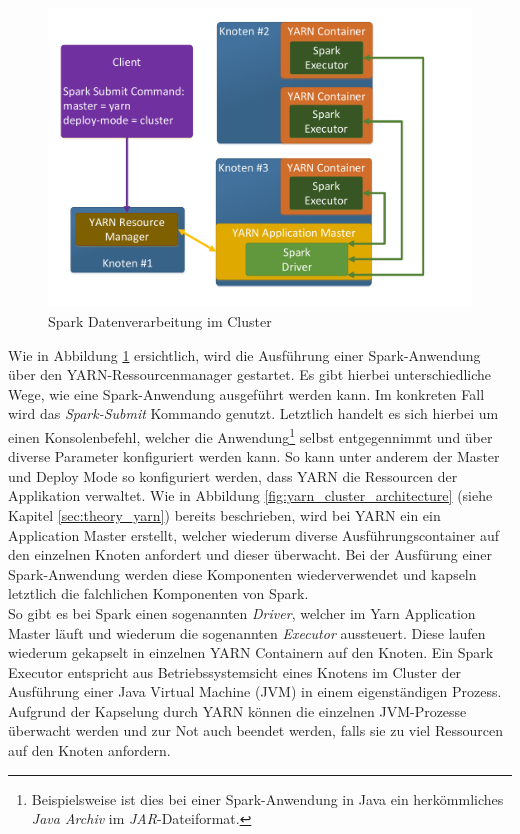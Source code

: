\begin{figure}[ht]
  \centering
  \includegraphics[width=\textwidth]{./resource/spark_cluster_architecture.pdf}
  \caption{Spark Datenverarbeitung im Cluster}
  \label{fig:spark_cluster_architecture}
\end{figure}

\noindent
Wie in Abbildung \ref{fig:spark_cluster_architecture} ersichtlich, wird die Ausführung einer Spark-Anwendung über den YARN-Ressourcenmanager gestartet. Es gibt hierbei unterschiedliche Wege, wie eine Spark-Anwendung ausgeführt werden kann. Im konkreten Fall wird das \textit{Spark-Submit} Kommando genutzt. Letztlich handelt es sich hierbei um einen Konsolenbefehl, welcher die Anwendung\footnote{Beispielsweise ist dies bei einer Spark-Anwendung in Java ein herkömmliches \textit{Java Archiv} im \textit{JAR}-Dateiformat.} selbst entgegennimmt und über diverse Parameter konfiguriert werden kann. So kann unter anderem der Master und Deploy Mode so konfiguriert werden, dass YARN die Ressourcen der Applikation verwaltet. Wie in Abbildung \ref{fig:yarn_cluster_architecture} (siehe Kapitel \ref{sec:theory_yarn}) bereits beschrieben, wird bei YARN ein ein Application Master erstellt, welcher wiederum diverse Ausführungscontainer auf den einzelnen Knoten anfordert und dieser überwacht. Bei der Ausfürung einer Spark-Anwendung werden diese Komponenten wiederverwendet und kapseln letztlich die falchlichen Komponenten von Spark.\\
So gibt es bei Spark einen sogenannten \textit{Driver}, welcher im Yarn Application Master läuft und wiederum die sogenannten \textit{Executor} aussteuert. Diese laufen wiederum gekapselt in einzelnen YARN Containern auf den Knoten. Ein Spark Executor entspricht aus Betriebssystemsicht eines Knotens im Cluster der Ausführung einer Java Virtual Machine (JVM) in einem eigenständigen Prozess. Aufgrund der Kapselung durch YARN können die einzelnen JVM-Prozesse überwacht werden und zur Not auch beendet werden, falls sie zu viel Ressourcen auf den Knoten anfordern.\\

